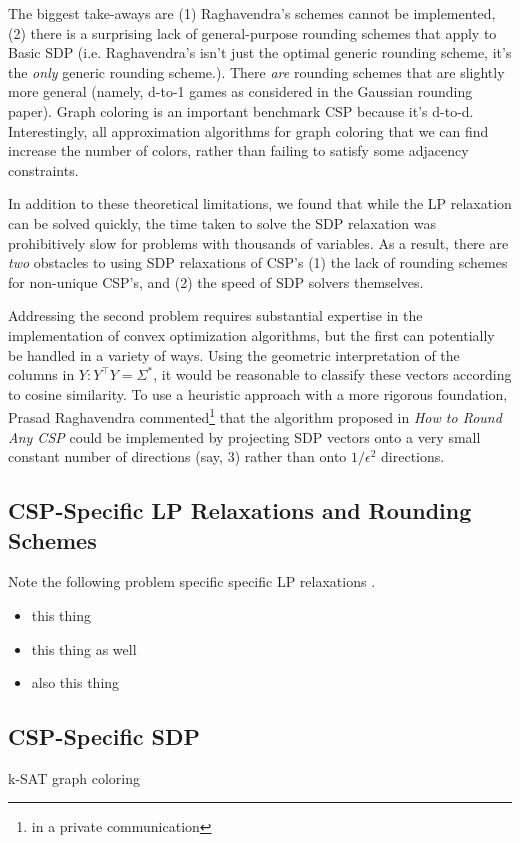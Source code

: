 	The biggest take-aways are (1) Raghavendra's schemes cannot be implemented, (2) there is a surprising lack of general-purpose rounding schemes that apply to Basic SDP (i.e. Raghavendra's isn't just the optimal generic rounding scheme, it's the \textit{only} generic rounding scheme.). There \textit{are} rounding schemes that are slightly more general (namely, d-to-1 games as considered in the Gaussian rounding paper). Graph coloring is an important benchmark CSP because it's d-to-d. Interestingly, all approximation algorithms for graph coloring that we can find increase the number of colors, rather than failing to satisfy some adjacency constraints. 
	
	In addition to these theoretical limitations, we found that while the LP relaxation can be solved quickly, the time taken to solve the SDP relaxation was prohibitively slow for problems with thousands of variables. As a result, there are \textit{two} obstacles to using SDP relaxations of CSP's (1) the lack of rounding schemes for non-unique CSP's, and (2) the speed of SDP solvers themselves.
	
	Addressing the second problem requires substantial expertise in the implementation of convex optimization algorithms, but the first can potentially be handled in a variety of ways. Using the geometric interpretation of the columns in $Y : Y^\intercal Y = \Sigma^*$, it would be reasonable to classify these vectors according to cosine similarity. To use a heuristic approach with a more rigorous foundation, Prasad Raghavendra commented\footnote{in a private communication} that the algorithm proposed in \textit{How to Round Any CSP} could be implemented by projecting SDP vectors onto a very small constant number of directions (say, 3) rather than onto $1/\epsilon^2$ directions.


\subsection{CSP-Specific LP Relaxations and Rounding Schemes}
Note the following problem specific specific LP relaxations \cite{GoeWil94,Asa97,Yan94}.
\begin{itemize}
\item this thing
\item this thing as well
\item also this thing
\end{itemize}

\subsection{CSP-Specific SDP}
k-SAT
graph coloring